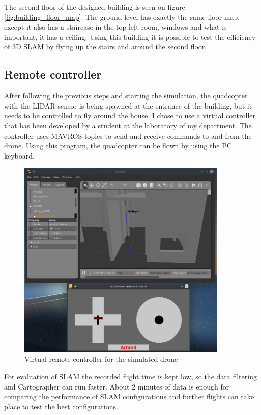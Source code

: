 The second floor of the designed building is seen on figure \ref{fig:building_floor_map}. The ground
level has exactly the same floor map, except it also has a staircase in the top left room, windows
and what is important, it has a ceiling. Using this building it is possible to test the efficiency 
of 3D SLAM by flying up the stairs and around the second floor.

\subsection{Remote controller}
After following the previous steps and starting the simulation, the quadcopter with the LIDAR sensor
is being spawned at the entrance of the building, but it needs to be controlled to fly around the 
house. I chose to use a virtual controller that has been developed by a student at the laboratory 
of my department. The controller uses MAVROS topics to send and receive commands to and from the drone. 
Using this program, the quadcopter can be flown by using the PC keyboard.

\begin{figure}[!ht]
    \centering
    \includegraphics[width=100mm, keepaspectratio]{figures/fly_with_controller.png}
    \caption{Virtual remote controller for the simulated drone}
    \label{fig:remote_controller}
\end{figure}

For evaluation of SLAM the recorded flight time is kept low, so the data filtering and Cartographer 
can run faster. About 2 minutes of data is enough for comparing the performance of SLAM configurations
and further flights can take place to test the best configurations.

